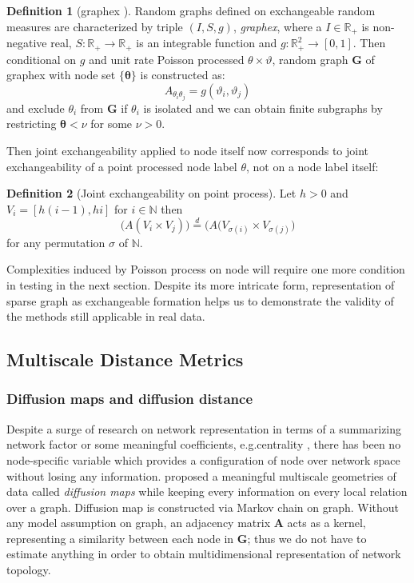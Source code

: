 \documentclass[12pt]{article}
\theoremstyle{definition}
\newtheorem{definition}{Definition}[section]
\begin{document}
\begin{definition}[graphex \cite{kallenberg1990exchangeable}]
\label{graphex}
Random graphs defined on exchangeable random measures are characterized by triple $(I, S, g)$, \textit{graphex}, where a $I \in \mathbb{R}_{+}$ is non-negative real, $S : \mathbb{R}_{+ } \rightarrow \mathbb{R}_{+}$ is an integrable function and $g : \mathbb{R}^{2}_{+} \rightarrow [0,1]$. Then conditional on $g$ and unit rate Poisson processed $\theta \times \vartheta$, random graph $\mathbf{G}$ of graphex with node set $\{ \mathbf{\theta} \}$ is constructed as:
\begin{equation}
A_{\theta_{i} \theta_{j}} = g(\vartheta_{i}, \vartheta_{j})
\end{equation}
and exclude $\theta_{i}$ from $\mathbf{G}$ if $\theta_{i}$ is isolated and we can obtain finite subgraphs by restricting $\mathbf{\theta}  < \nu$ for some $\nu > 0$.		
\end{definition}
Then joint exchangeability applied to node itself now corresponds to joint exchangeability of a point processed node label $\theta$, not on a node label itself:
\begin{definition}[Joint exchangeability on point process]
	\label{point}
	Let $h > 0$ and  $V_{i} = [h(i-1), hi ]$ for $i \in \mathbb{N}$ then
	\begin{equation}
	\big( A( V_{i} \times V_{j}  )   \big)  \stackrel{d}{=} \big( A( V_{\sigma(i)} \times V_{\sigma(j)}     \big)
	\end{equation}	
	for any permutation $\sigma$ of $\mathbb{N}$.		
\end{definition}
Complexities induced by Poisson process on node will require one more condition in testing in the next section. Despite its more intricate form, representation of sparse graph as exchangeable formation helps us to demonstrate the validity of the methods still applicable in real data.

\subsection{Multiscale Distance Metrics}	

\subsubsection{Diffusion maps and diffusion distance}	
Despite a surge of research on network representation in terms of a summarizing network factor \citep{hoff2002latent} or some meaningful coefficients, e.g.centrality \citep{mantzaris2013dynamic, sporns2007identification}, there has been no node-specific variable which provides a configuration of node over network space without losing any information. \cite{coifman2006diffusion} proposed a meaningful multiscale geometries of data called \textit{diffusion maps} while keeping every information on every local relation over a graph. Diffusion map is constructed via Markov chain on graph. Without any model assumption on graph, an adjacency matrix $\mathbf{A}$ acts as a kernel, representing a similarity between each node in $\mathbf{G}$; thus we do not have to estimate anything in order to obtain multidimensional representation of network topology. 
	
\end{document}
